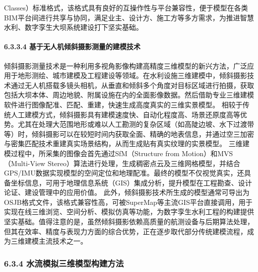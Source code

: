 Classes）标准格式，该格式具有良好的互操作性与平台兼容性，便于模型在各类BIM平台间进行共享与协同，满足业主、设计方、施工方等多方需求，为推进智慧水利、数字孪生大坝系统建设打下坚实基础。 \paragraph{6.3.3.4
基于无人机倾斜摄影测量的建模技术}\label{ux57faux4e8eux65e0ux4ebaux673aux503eux659cux6444ux5f71ux6d4bux91cfux7684ux5efaux6a21ux6280ux672f}
倾斜摄影测量技术是一种利用多视角影像构建高精度三维模型的新兴方法，广泛应用于地形测绘、城市建模及工程建设等领域。在水利设施三维建模中，倾斜摄影技术通过无人机搭载多镜头相机，从垂直和倾斜多个角度对目标区域进行拍摄，获取包括大坝本体、周边地貌、附属设施在内的全面影像数据。然后借助专业三维建模软件进行图像配准、匹配、重建，快速生成高度真实的三维实景模型。
相较于传统人工建模方式，倾斜摄影具有建模速度快、自动化程度高、场景还原度高等优势。尤其在处理大范围地形或难以人工勘测的复杂区域（如高陡边坡、水下过渡带等）时，倾斜摄影可以在较短时间内获取全面、精确的地表信息，并通过空三加密与密集匹配技术重建真实场景结构，从而生成贴有真实纹理的实景模型。
三维建模过程中，所采集的图像会首先通过SfM（Structure from Motion）和MVS（Multi-View
Stereo）算法进行处理，生成稠密点云及三维网格模型，并结合GPS/IMU数据实现模型的空间定位和地理配准。最终的模型不仅视觉真实，还具备坐标信息，可用于地理信息系统（GIS）集成分析，提升模型在工程勘查、设计论证、建设管理中的应用价值。
此外，倾斜摄影技术所生成的模型通常可导出为OSJB格式文件，该格式兼容性高，可被SuperMap等主流GIS平台直接调用，用于实现在线三维浏览、空间分析、模拟仿真等功能，为数字孪生水利工程的构建提供坚实基础。值得注意的是，虽然倾斜摄影依赖高质量的航测设备与后期算法处理，但其在效率、精度与表现力方面的综合优势，正在逐步取代部分传统建模流程，成为三维建模主流技术之一。
\subsubsection{6.3.4 水流模拟三维模型构建方法}\label{ux6c34ux6d41ux6a21ux62dfux4e09ux7ef4ux6a21ux578bux6784ux5efaux65b9ux6cd5}
